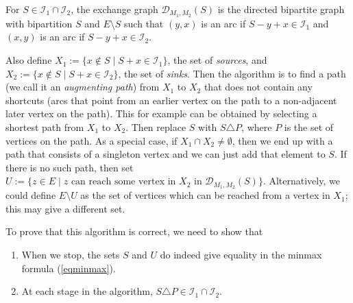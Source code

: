 \documentclass[12pt]{article}
\begin{document}
\begin{definition} For $S \in \mathcal{I}_1 \cap \mathcal{I}_2$, the
exchange graph $\mathcal{D}_{M_1,M_2}(S)$ is the directed bipartite
graph with bipartition $S$ and $E \setminus S$ such that $(y,x)$ is
an arc if $S-y+x \in \mathcal{I}_1$ and $(x,y)$ is an arc if $S-y+x
\in \mathcal{I}_2$.  \end{definition}

Also define $X_1 := \{x \not\in S \mid S+x \in \mathcal{I}_1\}$, the
set of {\it sources}, and
$X_2 := \{x \not\in S \mid S+x \in \mathcal{I}_2\}$, the set of {\it sinks}. Then the
algorithm is to find a path (we call it an \emph{augmenting path})
from $X_1$ to $X_2$ that does not contain any shortcuts (arcs that
point from an earlier vertex on the path to a non-adjacent later
vertex on the path). This for example can be obtained by selecting a
shortest path from $X_1$ to $X_2$. Then replace $S$ with $S \triangle P$, where $P$
is the set of vertices on the path. As a special case, if $X_1 \cap
X_2 \neq \emptyset$, then we end up with a path that consists of a
singleton vertex and we can just add that element to $S$.  If there is
no such path, then set $U := \{z \in E \mid z \text{ can reach some
vertex in } X_2 \text{ in }
\mathcal{D}_{M_1,M_2}(S)\}$. Alternatively, we could define
$E\setminus U$ as the set of vertices which can be reached from a
vertex in $X_1$; this may give a different set. 

To prove that this algorithm is correct, we need to show that
\begin{enumerate} \item When we stop, the sets $S$ and $U$ do indeed
give equality in the minmax formula (\ref{eqminmax}).

\item At each stage in the algorithm, $S \triangle P \in \mathcal{I}_1
\cap \mathcal{I}_2$.  \end{enumerate}
\end{document}
